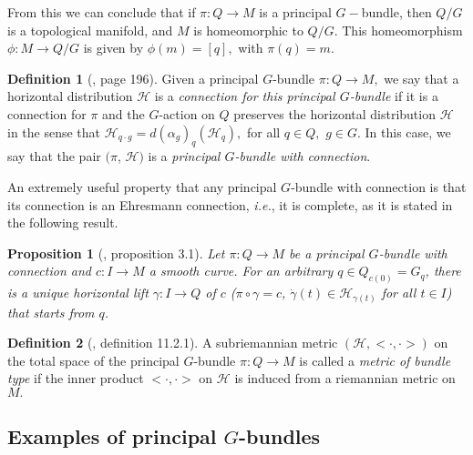 \documentclass[12pt, letterpaper, reqno]{amsart}
\theoremstyle{definition}
\newtheorem{df}{Definition}
\theoremstyle{plain}
\newtheorem{prop}{Proposition}
\theoremstyle{remark}
\begin{document}
From this we can conclude that if $ \pi: Q \rightarrow M $ is a principal $ G- $bundle, then $Q/G  $ is a topological manifold, and $M $ is homeomorphic to $ Q/G $. This homeomorphism $ \phi: M \rightarrow {Q/G}$  is given by $ \phi(m)=[q], $ with $ \pi(q)=m. $ 

\begin{df}[\cite{montgomery2002tour}, page 196]
	Given a principal $ G $-bundle $ \pi: Q \rightarrow M, $ we say that a horizontal distribution $ \mathcal{H} $ is a \textit{connection for this principal $ G $-bundle} if it is a connection for $ \pi $ and the $ G $-action on $ Q $ preserves the horizontal distribution $ \mathcal{H} $ in the sense that $ \mathcal{H}_{q\cdot g} = d(\alpha_g)_q (\mathcal{H}_q), $ for all $ q\in Q, $ $ g\in G $. In this case, we say that the pair $ (\pi$, $ \mathcal{H}) $ is a \textit{principal $ G $-bundle with connection}. 

\end{df}

An extremely useful property that any principal $ G $-bundle with connection is that its connection is an Ehresmann connection, \textit{i.e.}, it is complete, as it is stated in the following result. 

\begin{prop}[\cite{kobayashi1963foundations}, proposition 3.1]\label{prop:comp_bundle}
	Let $ \pi: Q \rightarrow M $ be a principal $ G $-bundle with connection and $ c: I \rightarrow M $ a smooth curve. For an arbitrary $ q\in Q_{c(0)}= G_q $, there is a unique horizontal lift $ \gamma: I \rightarrow Q $ of $ c $ ($\pi\circ\gamma =c$, $ \dot{\gamma}(t)\in \mathcal{H}_{\gamma(t)} $ for all $ t\in I $) that starts from $ q $.    	
\end{prop}

\begin{df}[\cite{montgomery2002tour}, definition 11.2.1]
	A subriemannian metric $ (\mathcal{H}, <\cdot,\cdot>) $ on the total space of the principal $ G $-bundle $ \pi: Q \rightarrow {M}
	 $ is called a \textit{metric of bundle type} if the inner product $ <\cdot,\cdot> $ on $ \mathcal{H}$ is induced from a riemannian metric on $ M. $ 
\end{df}

\subsection{Examples of principal $ G $-bundles}%
\label{sub:examples_of_principal_g_bundles}
\end{document}
